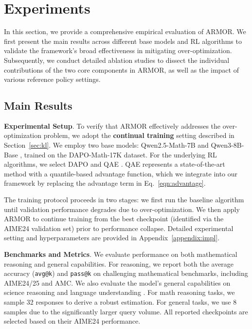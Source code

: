\section{Experiments}

In this section, we provide a comprehensive empirical evaluation of ARMOR.
We first present the main results across different base models and RL algorithms to validate the framework's broad effectiveness in mitigating over-optimization. 
Subsequently, we conduct detailed ablation studies to dissect the individual contributions of the two core components in ARMOR, as well as the impact of various reference policy settings.

\subsection{Main Results}

\textbf{Experimental Setup}.
To verify that ARMOR effectively addresses the over-optimization problem, we adopt the \textbf{continual training} setting described in Section~\ref{sec:kl}.
We employ two base models: Qwen2.5-Math-7B \citep{Qwen25Math} and Qwen3-8B-Base \citep{Qwen3}, trained on the DAPO-Math-17K dataset.
For the underlying RL algorithms, we select DAPO \citep{DAPO} and QAE \citep{QAE}. 
QAE represents a state-of-the-art method with a quantile-based advantage function, which we integrate into our framework by replacing the advantage term in Eq.~\eqref{eqn:advantage}.

The training protocol proceeds in two stages: we first run the baseline algorithm until validation performance degrades due to over-optimization. 
We then apply ARMOR to continue training from the best checkpoint (identified via the AIME24 validation set) prior to performance collapse. 
Detailed experimental setting and hyperparameters are provided in Appendix~\ref{appendix:impl}.

\textbf{Benchmarks and Metrics}. 
We evaluate performance on both mathematical reasoning and general capabilities. 
For reasoning, we report both the average accuracy (\texttt{avg@k}) and \texttt{pass@k} \citep{passk} on challenging mathematical benchmarks, including AIME24/25 and AMC. 
We also evaluate the model's general capabilities on science reasoning \citep[GPQA,][]{GPQA} and language understanding \citep[MMLU-Pro,][]{MMLU-Pro}. 
For math reasoning tasks, we sample 32 responses to derive a robust estimation. 
For general tasks, we use 8 samples due to the significantly larger query volume. 
All reported checkpoints are selected based on their AIME24 performance.


